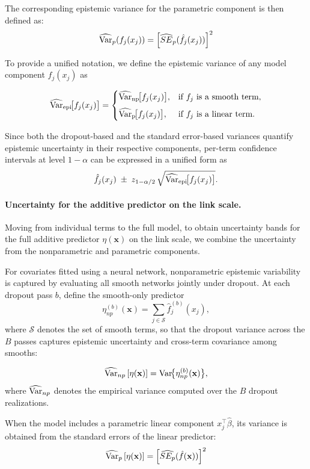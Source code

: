The corresponding epistemic variance for the parametric component is then defined as: 
\[
\widehat{\mathrm{Var}}_p(f_j(x_j)) = \left[ \widehat{SE}_p(\hat f_j(x_j)) \right]^2
\]

To provide a unified notation, we define the epistemic variance of any model component $f_j(x_j)$ as

\[
\widehat{\mathrm{Var}}_{\mathrm{epi}}\!\bigl[f_j(x_j)\bigr] =
\begin{cases}
\widehat{\mathrm{Var}}_{\mathrm{np}}\!\bigl[f_j(x_j)\bigr], & \text{if $f_j$ is a smooth term},\\[6pt]
\widehat{\mathrm{Var}}_{\mathrm{p}}\!\bigl[f_j(x_j)\bigr], & \text{if $f_j$ is a linear term.}
\end{cases}
\]

Since both the dropout-based and the standard error-based variances quantify epistemic uncertainty in their respective components, per-term confidence intervals at level $1-\alpha$ can be expressed in a unified form as
\[
\hat f_j(x_j)\;\pm\;
z_{1-\alpha/2}\,
\sqrt{\widehat{\mathrm{Var}}_{\mathrm{epi}}\!\bigl[f_j(x_j)\bigr]}.
\]

\paragraph{Uncertainty for the additive predictor on the link scale.}

Moving from individual terms to the full model, to obtain uncertainty bands for the full additive predictor
$\eta(\mathbf{x})$ on the link scale, we combine the uncertainty from the nonparametric and parametric components. 

For covariates fitted using a neural network, nonparametric epistemic variability is captured by evaluating all smooth networks jointly under dropout. At each dropout pass $b$, define the smooth-only predictor
\[
\eta_{np}^{(b)}(\mathbf{x}) = \sum_{j\in\mathcal{S}} \hat f_j^{(b)}(x_j),
\]
where $\mathcal{S}$ denotes the set of smooth terms, so that the dropout variance across the $B$ passes captures epistemic uncertainty and cross-term covariance among smooths:

\[
\widehat{\mathrm{Var}}_{np} \left[{\eta(\mathbf{x})} \right] = \mathrm{Var}\!\bigl\{\eta_{np}^{(b)}(\mathbf{x})\bigr\},
\]
where $\widehat{\mathrm{Var}}_{np}$ denotes the empirical variance computed over the $B$ dropout realizations.

When the model includes a parametric linear component $x_j^\top \hat\beta$, its variance is obtained from the standard errors of the linear predictor: 
\[
\widehat{\mathrm{Var}}_p\left[\eta(\mathbf{x})\right] = \left[ \widehat{SE_p}(\hat f(\mathbf{x})) \right]^2
\]

